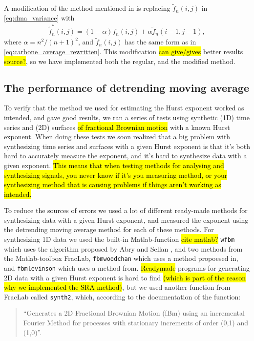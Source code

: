 A modification of the method mentioned in \cite{carbone2007algorithm} is replacing $\tilde f_n(i,j)$ in \cref{eq:dma_variance} with
\begin{align*}
    \tilde f_n^*(i,j) = (1-\alpha) f_n(i,j) + \alpha \tilde f_n(i-1,j-1),
\end{align*}
where $\alpha = n^2/(n+1)^2$, and $\tilde f_n(i,j)$ has the same form as in \cref{eq:carbone_average_rewritten}. This modification \hl{can give/gives} better results \hl{source?}, so we have  implemented both the regular, and the modified method.


\subsection{The performance of detrending moving average}
To verify that the method we used for estimating the Hurst exponent worked as intended, and gave good results, we ran a series of tests using synthetic (1D) time series and (2D) surfaces \hl{of fractional Brownian motion} with a known Hurst exponent. When doing these tests we soon realized that a big problem with synthesizing time series and surfaces with a given Hurst exponent is that it's both hard to accurately measure the exponent, and it's hard to synthesize data with a given exponent. \hl{This means that when testing methods for analysing and synthesizing signals, you never know if it's you measuring method, or your synthesizing method that is causing problems if things aren't working as intended.}

To reduce the sources of errors we used a lot of different ready-made methods for synthesizing data with a given Hurst exponent, and measured the exponent using the detrending moving average method for each of these methods. For synthesizing 1D data we used the built-in Matlab-function \hl{cite matlab?} \Verb!wfbm! which uses the algorithm proposed by Abry and Sellan \cite{abry1996wavelet}, and two methods from the Matlab-toolbox FracLab\cite{fraclab_toolbox}, \Verb!fbmwoodchan! which uses a method propoesed in\cite{wood1994simulation}, and \Verb!fbmlevinson! which uses a method from\cite{levinson1947wiener}. \hl{Readymade} programs for generating 2D data with a given Hurst exponent is hard to find \hl{(which is part of the reason why we implemented the SRA method)}, but we used another function from FracLab called \Verb!synth2!, which, according to the documentation of the function:%
\begin{quote}
    ``Generates a 2D Fractional Brownian Motion (fBm) using an incremental Fourier Method for processes with stationary increments of order (0,1) and (1,0)''.
\end{quote}

